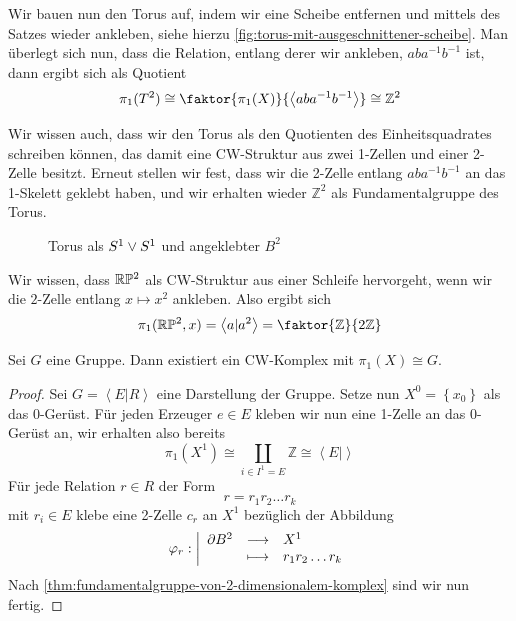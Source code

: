 \begin{example}
    Wir bauen nun den Torus auf, indem wir eine Scheibe entfernen und mittels des Satzes wieder ankleben, siehe hierzu \autoref{fig:torus-mit-ausgeschnittener-scheibe}. Man überlegt sich nun, dass die Relation, entlang derer wir ankleben, $aba^{-1}b^{-1}$ ist, dann ergibt sich als Quotient
    \[
        \pi_1(T^2) \cong \faktor{\pi_1(X)}{\left< aba^{-1}b^{-1} \right> } \cong \mathbb{Z}^2
    \] 

    Wir wissen auch, dass wir den Torus als den Quotienten des Einheitsquadrates schreiben können, das damit eine CW-Struktur aus zwei 1-Zellen und einer 2-Zelle besitzt. Erneut stellen wir fest, dass wir die 2-Zelle entlang $aba^{-1}b^{-1}$ an das 1-Skelett geklebt haben, und wir erhalten wieder $\mathbb{Z}^2$ als Fundamentalgruppe des Torus.
\end{example}

\begin{figure}[ht]
    \centering
    \caption{Torus als $S^1 \vee S^1$ und angeklebter  $B^2$}
    \label{fig:torus-mit-ausgeschnittener-scheibe}
\end{figure}

\begin{example}
    Wir wissen, dass $\mathbb{R}\mathbb{P}^2$ als CW-Struktur aus einer Schleife hervorgeht, wenn wir die $2$-Zelle entlang  $x \mapsto x^2$ ankleben. Also ergibt sich
    \[
        \pi_1(\R\mathbb{P}^2,x) = \left< a | a^2 \right>  = \faktor{\mathbb{Z}}{2\mathbb{Z}}
    \] 
\end{example}

\begin{corollary}
    Sei $G$ eine Gruppe. Dann existiert ein CW-Komplex mit  $\pi_1(X) \cong G$.
\end{corollary}

\begin{proof}
    Sei $G = \left< E | R \right> $ eine Darstellung der Gruppe. Setze nun $X^0 = \left \{x_0\right\} $ als das 0-Gerüst. Für jeden Erzeuger $e\in E$ kleben wir nun eine 1-Zelle an das 0-Gerüst an, wir erhalten also bereits
    \[
        \pi_1(X^1) \cong \coprod _{i \in I^1 = E} \mathbb{Z} \cong \left< E |  \right> 
    \] 
    Für jede Relation $r\in R$ der Form
    \[
    r = r_1r_2\ldots r_k
    \] 
    mit $r_i \in E$ klebe eine 2-Zelle $c_r$ an  $X^1$ bezüglich der Abbildung
        \begin{equation*}
        \varphi_r: \left| \begin{array}{c c l} 
        \partial B^2 & \longrightarrow & X^1 \\
         & \longmapsto &  r_1r_2\ldots r_k
        \end{array} \right.
    \end{equation*}
    Nach \autoref{thm:fundamentalgruppe-von-2-dimensionalem-komplex} sind wir nun fertig.
\end{proof}

